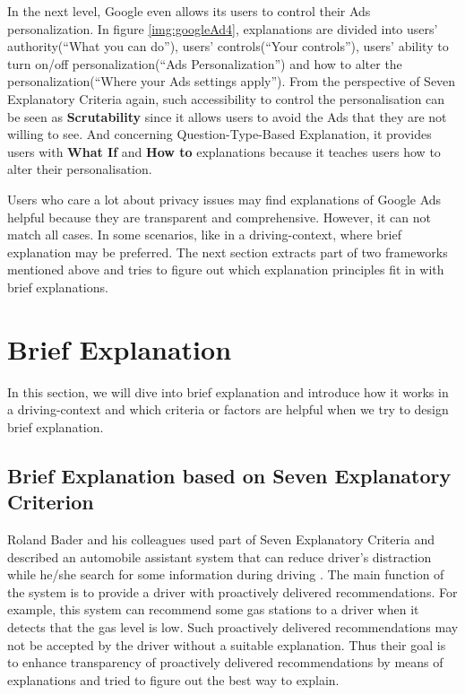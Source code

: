         \indent
        In the next level, Google even allows its users to control their Ads personalization. In figure \ref{img:googleAd4}, explanations are divided into users' authority(``What you can do''), users' controls(``Your controls''), users' ability to turn on/off personalization(``Ads Personalization'') and how to alter the personalization(``Where your Ads settings apply''). From the perspective of Seven Explanatory Criteria again, such accessibility to control the personalisation can be seen as \textbf{Scrutability} since it allows users to avoid the Ads that they are not willing to see. And concerning Question-Type-Based Explanation, it provides users with \textbf{What If} and \textbf{How to}  explanations because it teaches users how to alter their personalisation.
        
        \indent
        Users who care a lot about privacy issues may find explanations of Google Ads helpful because they are transparent and comprehensive. However, it can not match all cases. In some scenarios, like in a driving-context, where brief explanation may be preferred. The next section extracts part of two frameworks mentioned above and tries to figure out which explanation principles fit in with brief explanations.

\section{Brief Explanation}
    \indent In this section, we will dive into brief explanation and introduce how it works in a driving-context and which criteria or factors are helpful when we try to design brief explanation.

    \subsection{Brief Explanation based on Seven Explanatory Criterion}

        \indent Roland Bader and his colleagues used part of Seven Explanatory Criteria and described an automobile assistant system that can reduce driver's distraction while he/she search for some information during driving \cite{bader122011explanations}. The main function of the system is to provide a driver with proactively delivered recommendations. For example, this system can recommend some gas stations to a driver when it detects that the gas level is low. Such proactively delivered recommendations may not be accepted by the driver without a suitable explanation. Thus their goal is to enhance transparency of proactively delivered recommendations by means of explanations and tried to figure out the best way to explain.
    
